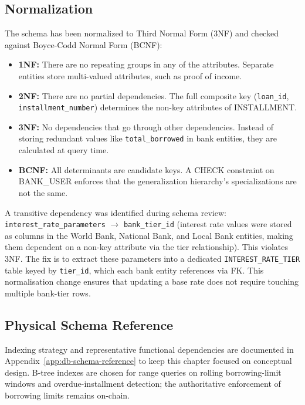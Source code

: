 \documentclass[12pt,a4paper]{report}
\begin{document}
\subsection{Normalization}

The schema has been normalized to Third Normal Form (3NF) and checked against Boyce-Codd Normal Form (BCNF):

\begin{itemize}[noitemsep]
\item \textbf{1NF:} There are no repeating groups in any of the attributes. Separate entities store multi-valued attributes, such as proof of income.
\item \textbf{2NF:} There are no partial dependencies. The full composite key (\texttt{loan\_id}, \texttt{installment\_number}) determines the non-key attributes of INSTALLMENT.
\item \textbf{3NF:} No dependencies that go through other dependencies. Instead of storing redundant values like \texttt{total\_borrowed} in bank entities, they are calculated at query time.
\item \textbf{BCNF:} All determinants are candidate keys. A CHECK constraint on BANK\_USER enforces that the generalization hierarchy's specializations are not the same.
\end{itemize}

\label{sec:normalization}
A transitive dependency was identified during schema review: \texttt{interest\_rate\_parameters} $\to$ \texttt{bank\_tier\_id} (interest rate values were stored as columns in the World Bank, National Bank, and Local Bank entities, making them dependent on a non-key attribute via the tier relationship). This violates 3NF. The fix is to extract these parameters into a dedicated \texttt{INTEREST\_RATE\_TIER} table keyed by \texttt{tier\_id}, which each bank entity references via FK. This normalisation change ensures that updating a base rate does not require touching multiple bank-tier rows.

\subsection{Physical Schema Reference}

Indexing strategy and representative functional dependencies are documented in Appendix~\ref{app:db-schema-reference} to keep this chapter focused on conceptual design. B-tree indexes are chosen for range queries on rolling borrowing-limit windows and overdue-installment detection; the authoritative enforcement of borrowing limits remains on-chain.
\end{document}
